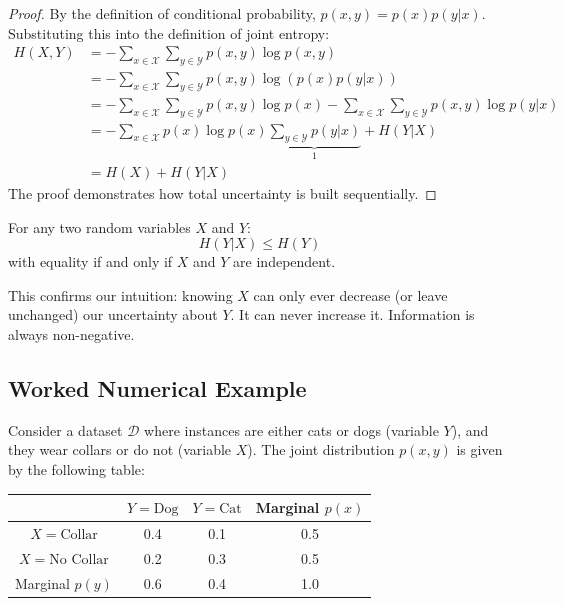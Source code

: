 \begin{proof}
By the definition of conditional probability, $p(x, y) = p(x)p(y|x)$. Substituting this into the definition of joint entropy:
\begin{align*}
    H(X, Y) &= -\sum_{x \in \mathcal{X}} \sum_{y \in \mathcal{Y}} p(x, y) \log p(x, y) \\
    &= -\sum_{x \in \mathcal{X}} \sum_{y \in \mathcal{Y}} p(x, y) \log \left( p(x) p(y|x) \right) \\
    &= -\sum_{x \in \mathcal{X}} \sum_{y \in \mathcal{Y}} p(x, y) \log p(x) - \sum_{x \in \mathcal{X}} \sum_{y \in \mathcal{Y}} p(x, y) \log p(y|x) \\
    &= -\sum_{x \in \mathcal{X}} p(x) \log p(x) \underbrace{\sum_{y \in \mathcal{Y}} p(y|x)}_{1} + H(Y|X) \\
    &= H(X) + H(Y|X)
\end{align*}
The proof demonstrates how total uncertainty is built sequentially.
\end{proof}

\begin{corollary}
For any two random variables $X$ and $Y$:
\begin{equation}
    H(Y|X) \leq H(Y)
\end{equation}
with equality if and only if $X$ and $Y$ are independent.
\end{corollary}
This confirms our intuition: knowing $X$ can only ever decrease (or leave unchanged) our uncertainty about $Y$. It can never increase it. Information is always non-negative.

\subsection{Worked Numerical Example}

Consider a dataset $\mathcal{D}$ where instances are either cats or dogs (variable $Y$), and they wear collars or do not (variable $X$). The joint distribution $p(x, y)$ is given by the following table:

\begin{center}
\begin{tabular}{c|cc|c}
 & $Y = \text{Dog}$ & $Y = \text{Cat}$ & Marginal $p(x)$ \\
\hline
$X = \text{Collar}$ & 0.4 & 0.1 & 0.5 \\
$X = \text{No Collar}$ & 0.2 & 0.3 & 0.5 \\
\hline
Marginal $p(y)$ & 0.6 & 0.4 & 1.0
\end{tabular}
\end{center}


